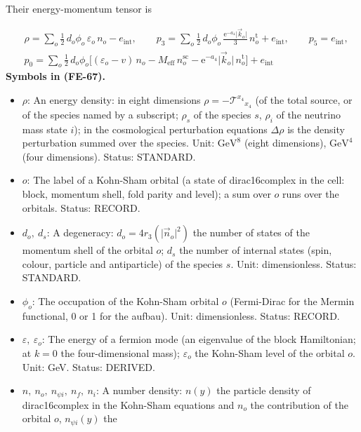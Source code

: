\documentclass[
  10pt,
]{article}
\providecommand{\tightlist}{%
  \setlength{\itemsep}{0pt}\setlength{\parskip}{0pt}}
\begin{document}
Their energy-momentum tensor is

\[
\begin{aligned}
&\rho = \sum_o\tfrac12\,d_o\phi_o\,\varepsilon_o\,n_o - e_{\mathrm{int}},\qquad
 p_3 = \sum_o\tfrac12\,d_o\phi_o\,\frac{\mathrm{e}^{-a_4}\lvert\vec k_o\rvert}{3}\,n^{\mathrm{t}}_o +
 e_{\mathrm{int}},
 \qquad p_5 = e_{\mathrm{int}},\\
&p_0 = \sum_o\tfrac12\,d_o\phi_o\Big[(\varepsilon_o - v)\,n_o - M_{\mathrm{eff}}\,n^{\mathrm{sc}}_o
 - \mathrm{e}^{-a_4}\lvert\vec k_o\rvert\,n^{\mathrm{t}}_o\Big] + e_{\mathrm{int}}
\end{aligned} \tag{FE-67}
\] \textbf{Symbols in (FE-67).}

\begin{itemize}
\tightlist
\item
  \(\rho\): An energy density: in eight dimensions
  \(\rho = -\mathcal{T}^{x_4}{}_{x_4}\) (of the total source, or of the
  species named by a subscript; \(\rho_s\) of the species \(s\),
  \(\rho_i\) of the neutrino mass state \(i\)); in the cosmological
  perturbation equations \(\Delta\rho\) is the density perturbation
  summed over the species. Unit: \(\mathrm{GeV}^{8}\) (eight
  dimensions), \(\mathrm{GeV}^{4}\) (four dimensions). Status: STANDARD.
\item
  \(o\): The label of a Kohn-Sham orbital (a state of dirac16complex in
  the cell: block, momentum shell, fold parity and level); a sum over
  \(o\) runs over the orbitals. Status: RECORD.
\item
  \(d_o,\ d_s\): A degeneracy: \(d_o = 4r_3(\lvert\vec n_o\rvert^2)\)
  the number of states of the momentum shell of the orbital \(o\);
  \(d_s\) the number of internal states (spin, colour, particle and
  antiparticle) of the species \(s\). Unit: dimensionless. Status:
  STANDARD.
\item
  \(\phi_o\): The occupation of the Kohn-Sham orbital \(o\) (Fermi-Dirac
  for the Mermin functional, 0 or 1 for the aufbau). Unit:
  dimensionless. Status: RECORD.
\item
  \(\varepsilon,\ \varepsilon_o\): The energy of a fermion mode (an
  eigenvalue of the block Hamiltonian; at \(k = 0\) the four-dimensional
  mass); \(\varepsilon_o\) the Kohn-Sham level of the orbital \(o\).
  Unit: GeV. Status: DERIVED.
\item
  \(n,\ n_o,\ n_{\psi i},\ n_f,\ n_i\): A number density: \(n(y)\) the
  particle density of dirac16complex in the Kohn-Sham equations and
  \(n_o\) the contribution of the orbital \(o\), \(n_{\psi i}(y)\) the

\end{itemize}
\end{document}
